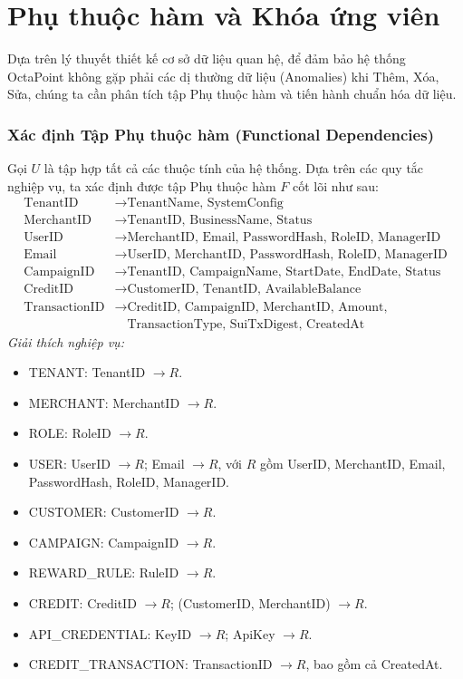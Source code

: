 \section{Phụ thuộc hàm và Khóa ứng viên}

Dựa trên lý thuyết thiết kế cơ sở dữ liệu quan hệ, để đảm bảo hệ thống OctaPoint không gặp phải các dị thường dữ liệu (Anomalies) khi Thêm, Xóa, Sửa, chúng ta cần phân tích tập Phụ thuộc hàm và tiến hành chuẩn hóa dữ liệu.

\subsubsection{Xác định Tập Phụ thuộc hàm (Functional Dependencies)}
Gọi $U$ là tập hợp tất cả các thuộc tính của hệ thống. Dựa trên các quy tắc nghiệp vụ, ta xác định được tập Phụ thuộc hàm $F$ cốt lõi như sau:
\begin{align*}
    \text{TenantID} &\rightarrow \text{TenantName, SystemConfig} \tag{F1} \\
    \text{MerchantID} &\rightarrow \text{TenantID, BusinessName, Status} \tag{F2} \\
    \text{UserID} &\rightarrow \text{MerchantID, Email, PasswordHash, RoleID, ManagerID} \tag{F3} \\
    \text{Email} &\rightarrow \text{UserID, MerchantID, PasswordHash, RoleID, ManagerID} \tag{F4} \\
    \text{CampaignID} &\rightarrow \text{TenantID, CampaignName, StartDate, EndDate, Status} \tag{F5} \\
    \text{CreditID} &\rightarrow \text{CustomerID, TenantID, AvailableBalance} \tag{F6} \\
    \text{TransactionID} &\rightarrow \text{CreditID, CampaignID, MerchantID, Amount,} \nonumber \\
    &\quad \text{TransactionType, SuiTxDigest, CreatedAt} \tag{F7}
\end{align*}
\textit{Giải thích nghiệp vụ:} 
\begin{itemize}
    \item TENANT: TenantID $\rightarrow R$.
    \item MERCHANT: MerchantID $\rightarrow R$.
    \item ROLE: RoleID $\rightarrow R$.
    \item USER: UserID $\rightarrow R$; Email $\rightarrow R$, với $R$ gồm UserID, MerchantID, Email, PasswordHash, RoleID, ManagerID.
    \item CUSTOMER: CustomerID $\rightarrow R$.
    \item CAMPAIGN: CampaignID $\rightarrow R$.
    \item REWARD\_RULE: RuleID $\rightarrow R$.
    \item CREDIT: CreditID $\rightarrow R$; (CustomerID, MerchantID) $\rightarrow R$.
    \item API\_CREDENTIAL: KeyID $\rightarrow R$; ApiKey $\rightarrow R$.
    \item CREDIT\_TRANSACTION: TransactionID $\rightarrow R$, bao gồm cả CreatedAt.
\end{itemize}
